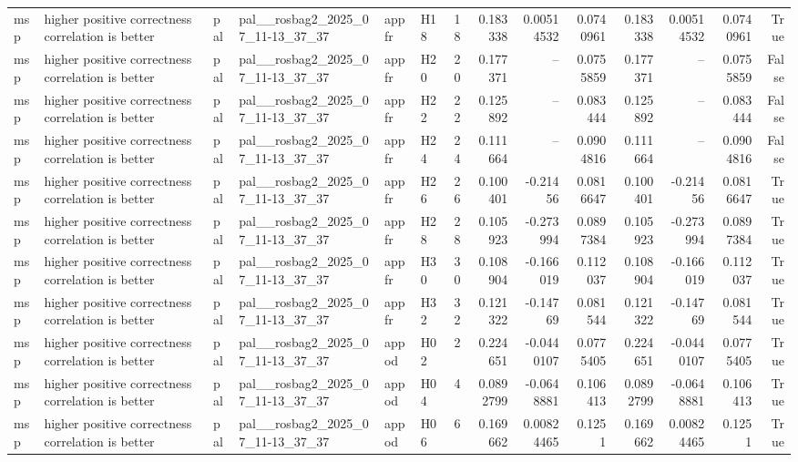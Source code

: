 \begin{longtable}{llllllrrrrrrrr}
msp & higher positive correctness correlation is better & pal & pal\_\_rosbag2\_2025\_07\_11-13\_37\_37 & appfr & H18 & 18 & 0.183338 & 0.00514532 & 0.0740961 & 0.183338 & 0.00514532 & 0.0740961 & True \\
msp & higher positive correctness correlation is better & pal & pal\_\_rosbag2\_2025\_07\_11-13\_37\_37 & appfr & H20 & 20 & 0.177371 & -- & 0.0755859 & 0.177371 & -- & 0.0755859 & False \\
msp & higher positive correctness correlation is better & pal & pal\_\_rosbag2\_2025\_07\_11-13\_37\_37 & appfr & H22 & 22 & 0.125892 & -- & 0.083444 & 0.125892 & -- & 0.083444 & False \\
msp & higher positive correctness correlation is better & pal & pal\_\_rosbag2\_2025\_07\_11-13\_37\_37 & appfr & H24 & 24 & 0.111664 & -- & 0.0904816 & 0.111664 & -- & 0.0904816 & False \\
msp & higher positive correctness correlation is better & pal & pal\_\_rosbag2\_2025\_07\_11-13\_37\_37 & appfr & H26 & 26 & 0.100401 & -0.21456 & 0.0816647 & 0.100401 & -0.21456 & 0.0816647 & True \\
msp & higher positive correctness correlation is better & pal & pal\_\_rosbag2\_2025\_07\_11-13\_37\_37 & appfr & H28 & 28 & 0.105923 & -0.273994 & 0.0897384 & 0.105923 & -0.273994 & 0.0897384 & True \\
msp & higher positive correctness correlation is better & pal & pal\_\_rosbag2\_2025\_07\_11-13\_37\_37 & appfr & H30 & 30 & 0.108904 & -0.166019 & 0.112037 & 0.108904 & -0.166019 & 0.112037 & True \\
msp & higher positive correctness correlation is better & pal & pal\_\_rosbag2\_2025\_07\_11-13\_37\_37 & appfr & H32 & 32 & 0.121322 & -0.14769 & 0.081544 & 0.121322 & -0.14769 & 0.081544 & True \\
msp & higher positive correctness correlation is better & pal & pal\_\_rosbag2\_2025\_07\_11-13\_37\_37 & appod & H02 & 2 & 0.224651 & -0.0440107 & 0.0775405 & 0.224651 & -0.0440107 & 0.0775405 & True \\
msp & higher positive correctness correlation is better & pal & pal\_\_rosbag2\_2025\_07\_11-13\_37\_37 & appod & H04 & 4 & 0.0892799 & -0.0648881 & 0.106413 & 0.0892799 & -0.0648881 & 0.106413 & True \\
msp & higher positive correctness correlation is better & pal & pal\_\_rosbag2\_2025\_07\_11-13\_37\_37 & appod & H06 & 6 & 0.169662 & 0.00824465 & 0.1251 & 0.169662 & 0.00824465 & 0.1251 & True \\

\end{longtable}
